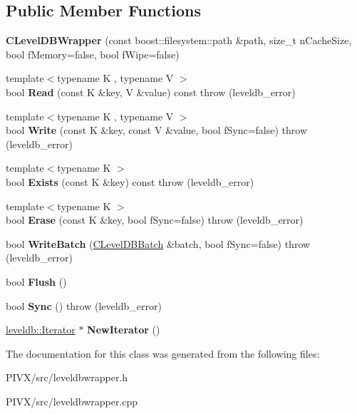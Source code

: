 \subsection*{Public Member Functions}
\begin{DoxyCompactItemize}
\item 
\mbox{\label{class_c_level_d_b_wrapper_ae796b1190c072df6275e0ada4d187943}} 
{\bfseries C\+Level\+D\+B\+Wrapper} (const boost\+::filesystem\+::path \&path, size\+\_\+t n\+Cache\+Size, bool f\+Memory=false, bool f\+Wipe=false)
\item 
\mbox{\label{class_c_level_d_b_wrapper_a0cb51d3b8f042641b2d0aa76c3185527}} 
{\footnotesize template$<$typename K , typename V $>$ }\\bool {\bfseries Read} (const K \&key, V \&value) const  throw (leveldb\+\_\+error)
\item 
\mbox{\label{class_c_level_d_b_wrapper_a740caa1aefbafc888838ea7f70dc31f4}} 
{\footnotesize template$<$typename K , typename V $>$ }\\bool {\bfseries Write} (const K \&key, const V \&value, bool f\+Sync=false)  throw (leveldb\+\_\+error)
\item 
\mbox{\label{class_c_level_d_b_wrapper_a43c427da8e32af87a09d3cb60353ef0e}} 
{\footnotesize template$<$typename K $>$ }\\bool {\bfseries Exists} (const K \&key) const  throw (leveldb\+\_\+error)
\item 
\mbox{\label{class_c_level_d_b_wrapper_a9f67e2880ba191fdc9439ba34e315d72}} 
{\footnotesize template$<$typename K $>$ }\\bool {\bfseries Erase} (const K \&key, bool f\+Sync=false)  throw (leveldb\+\_\+error)
\item 
\mbox{\label{class_c_level_d_b_wrapper_a820484c9e427f9e3400396e750acf4b8}} 
bool {\bfseries Write\+Batch} (\mbox{\hyperlink{class_c_level_d_b_batch}{C\+Level\+D\+B\+Batch}} \&batch, bool f\+Sync=false)  throw (leveldb\+\_\+error)
\item 
\mbox{\label{class_c_level_d_b_wrapper_a639fbfd6652941a1ab570c202197a32a}} 
bool {\bfseries Flush} ()
\item 
\mbox{\label{class_c_level_d_b_wrapper_abd05e914893cd610e8444871f829d8c9}} 
bool {\bfseries Sync} ()  throw (leveldb\+\_\+error)
\item 
\mbox{\label{class_c_level_d_b_wrapper_a5f43d01a8a6b26464b875d190e002d74}} 
\mbox{\hyperlink{classleveldb_1_1_iterator}{leveldb\+::\+Iterator}} $\ast$ {\bfseries New\+Iterator} ()
\end{DoxyCompactItemize}


The documentation for this class was generated from the following files\+:\begin{DoxyCompactItemize}
\item 
P\+I\+V\+X/src/leveldbwrapper.\+h\item 
P\+I\+V\+X/src/leveldbwrapper.\+cpp\end{DoxyCompactItemize}
